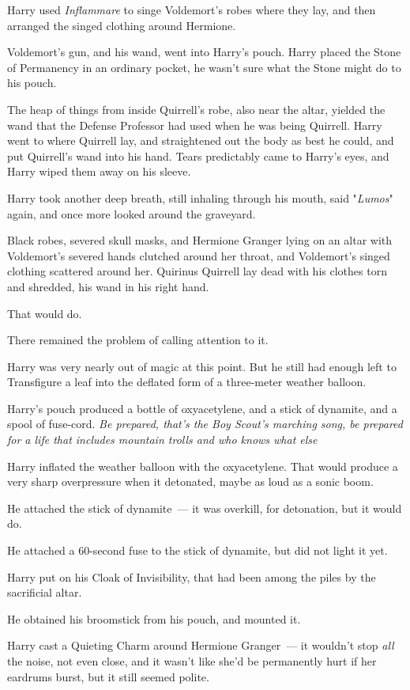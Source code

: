 Harry used \emph{Inflammare} to singe Voldemort's robes where they lay, and
then arranged the singed clothing around Hermione.

Voldemort's gun, and his wand, went into Harry's pouch. Harry placed the Stone
of Permanency in an ordinary pocket, he wasn't sure what the Stone might do to
his pouch.

The heap of things from inside Quirrell's robe, also near the altar, yielded
the wand that the Defense Professor had used when he was being Quirrell. Harry
went to where Quirrell lay, and straightened out the body as best he could, and
put Quirrell's wand into his hand. Tears predictably came to Harry's eyes, and
Harry wiped them away on his sleeve.

Harry took another deep breath, still inhaling through his mouth, said
"\emph{Lumos}" again, and once more looked around the graveyard.

Black robes, severed skull masks, and Hermione Granger lying on an altar with
Voldemort's severed hands clutched around her throat, and Voldemort's singed
clothing scattered around her. Quirinus Quirrell lay dead with his clothes torn
and shredded, his wand in his right hand.

That would do.

There remained the problem of calling attention to it.

Harry was very nearly out of magic at this point. But he still had enough left
to Transfigure a leaf into the deflated form of a three-meter weather balloon.

Harry's pouch produced a bottle of oxyacetylene, and a stick of dynamite, and a
spool of fuse-cord. \emph{Be prepared, that's the Boy Scout's marching song, be
prepared for a life that includes mountain trolls and who knows what
else{\el}}

Harry inflated the weather balloon with the oxyacetylene. That would produce a
very sharp overpressure when it detonated, maybe as loud as a sonic boom.

He attached the stick of dynamite~--- it was overkill, for detonation, but it
would do.

He attached a 60-second fuse to the stick of dynamite, but did not light it yet.

Harry put on his Cloak of Invisibility, that had been among the piles by the
sacrificial altar.

He obtained his broomstick from his pouch, and mounted it.

Harry cast a Quieting Charm around Hermione Granger~--- it wouldn't stop
\emph{all} the noise, not even close, and it wasn't like she'd be permanently
hurt if her eardrums burst, but it still seemed polite.

